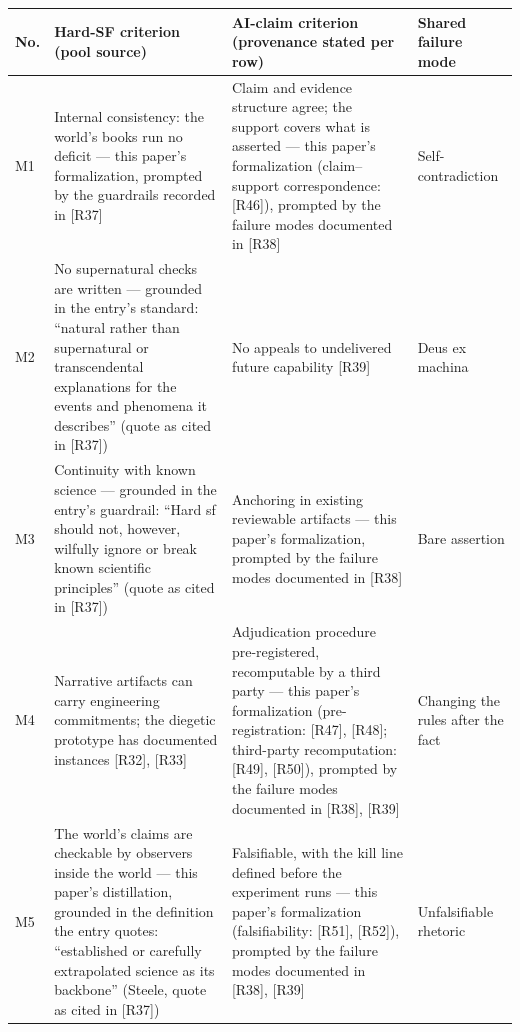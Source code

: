 \documentclass[11pt,a4paper]{article}
\begin{document}
\begin{table}[htbp]
\centering
\small
\setlength{\tabcolsep}{3.5pt}
\renewcommand{\arraystretch}{1.18}
\begin{tabularx}{0.985\textwidth}{@{}>{\raggedright\arraybackslash}p{}>{\raggedright\arraybackslash}X>{\raggedright\arraybackslash}X>{\raggedright\arraybackslash}p{}@{}}
\toprule
\textbf{No.} & \textbf{Hard-SF criterion (pool source)} & \textbf{AI-claim criterion (provenance stated per row)} & \textbf{Shared failure mode} \\
\midrule
M1 & Internal consistency: the world's books run no deficit — this paper's formalization, prompted by the guardrails recorded in [R37] & Claim and evidence structure agree; the support covers what is asserted — this paper's formalization (claim–support correspondence: [R46]), prompted by the failure modes documented in [R38] & Self-contradiction \\
M2 & No supernatural checks are written — grounded in the entry's standard: ``natural rather than supernatural or transcendental explanations for the events and phenomena it describes'' (quote as cited in [R37]) & No appeals to undelivered future capability [R39] & Deus ex machina \\
M3 & Continuity with known science — grounded in the entry's guardrail: ``Hard sf should not, however, wilfully ignore or break known scientific principles'' (quote as cited in [R37]) & Anchoring in existing reviewable artifacts — this paper's formalization, prompted by the failure modes documented in [R38] & Bare assertion \\
M4 & Narrative artifacts can carry engineering commitments; the diegetic prototype has documented instances [R32], [R33] & Adjudication procedure pre-registered, recomputable by a third party — this paper's formalization (pre-registration: [R47], [R48]; third-party recomputation: [R49], [R50]), prompted by the failure modes documented in [R38], [R39] & Changing the rules after the fact \\
M5 & The world's claims are checkable by observers inside the world — this paper's distillation, grounded in the definition the entry quotes: ``established or carefully extrapolated science as its backbone'' (Steele, quote as cited in [R37]) & Falsifiable, with the kill line defined before the experiment runs — this paper's formalization (falsifiability: [R51], [R52]), prompted by the failure modes documented in [R38], [R39] & Unfalsifiable rhetoric \\
\bottomrule
\end{tabularx}
\end{table}
\end{document}
